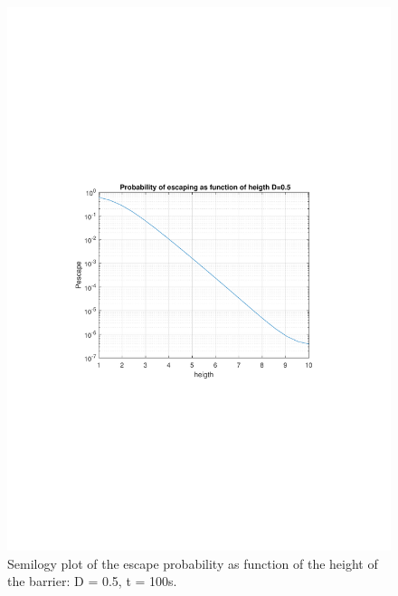 \documentclass[11pt,letterpaper]{article}
\begin{document}
\begin{figure}
\centering
\includegraphics[width=1\linewidth]{./arrhenius05}
\caption{Semilogy plot of the escape probability as function of the height of the barrier: D = 0.5, t = 100s.}
\label{fig:arrhenius05}
\end{figure}
\end{document}
